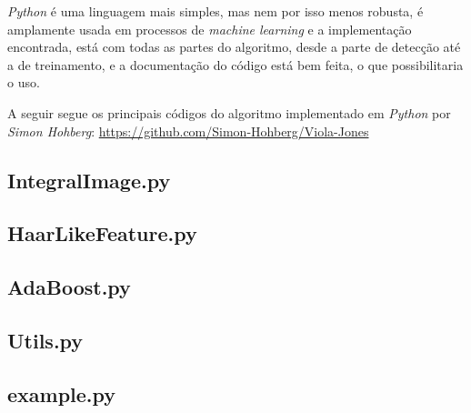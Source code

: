 \documentclass[12pt,a4paper]{article}
\begin{document}
\textit{Python} é uma linguagem mais simples, mas nem por isso menos robusta, é amplamente usada em processos de \textit{machine learning} e a implementação encontrada, está com todas as partes do algoritmo, desde a parte de detecção até a de treinamento, e a documentação do código está bem feita, o que possibilitaria o uso.

A seguir segue os principais códigos do algoritmo implementado em \textit{Python} por \textit{Simon Hohberg}:
\url{https://github.com/Simon-Hohberg/Viola-Jones}



\subsection{IntegralImage.py}

 
 
 \subsection{HaarLikeFeature.py}

 

\subsection{AdaBoost.py}


\subsection{Utils.py}



\subsection{example.py}




%
\end{document}
